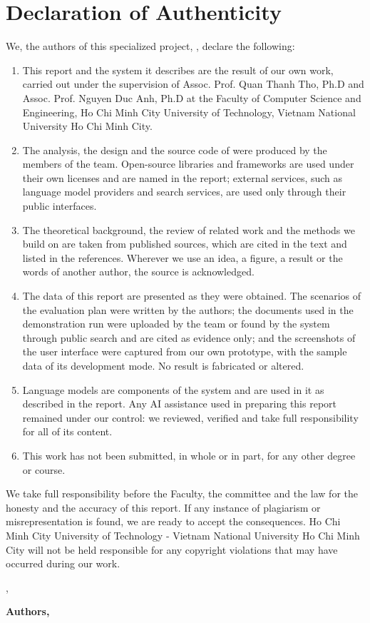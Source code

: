 \newpage

\section*{\Huge Declaration of Authenticity}

We, the authors of this specialized project, \textit{\reporttitle}, declare the following:
\begin{enumerate}
    \item This report and the system it describes are the result of our own work, carried out under the supervision of Assoc. Prof. Quan Thanh Tho, Ph.D and Assoc. Prof. Nguyen Duc Anh, Ph.D at the Faculty of Computer Science and Engineering, Ho Chi Minh City University of Technology, Vietnam National University Ho Chi Minh City.
    \item The analysis, the design and the source code of \sysname{} were produced by the members of the team. Open-source libraries and frameworks are used under their own licenses and are named in the report; external services, such as language model providers and search services, are used only through their public interfaces.
    \item The theoretical background, the review of related work and the methods we build on are taken from published sources, which are cited in the text and listed in the references. Wherever we use an idea, a figure, a result or the words of another author, the source is acknowledged.
    \item The data of this report are presented as they were obtained. The scenarios of the evaluation plan were written by the authors; the documents used in the demonstration run were uploaded by the team or found by the system through public search and are cited as evidence only; and the screenshots of the user interface were captured from our own prototype, with the sample data of its development mode. No result is fabricated or altered.
    \item Language models are components of the system and are used in it as described in the report. Any AI assistance used in preparing this report remained under our control: we reviewed, verified and take full responsibility for all of its content.
    \item This work has not been submitted, in whole or in part, for any other degree or course.
\end{enumerate}

We take full responsibility before the Faculty, the committee and the law for the honesty and the accuracy of this report. If any instance of plagiarism or misrepresentation is found, we are ready to accept the consequences. Ho Chi Minh City University of Technology - Vietnam National University Ho Chi Minh City will not be held responsible for any copyright violations that may have occurred during our work.
\newline

\begin{flushright}
\begin{minipage}[t]{0.55\textwidth}
\begin{center}
    \reportplace, \reportdate

    \textbf{Authors,}

    \textit{\reportauthor}
    \end{center}
\end{minipage}
\end{flushright}

